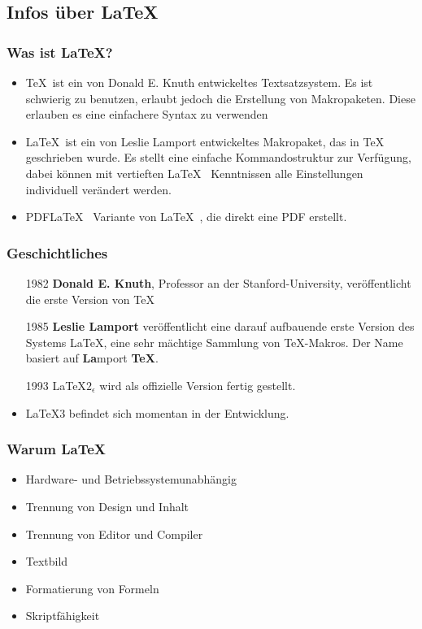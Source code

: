 \subsection{Infos über \LaTeX}


\begin{frame}
\frametitle{Was ist \LaTeX?}
\begin{itemize}[<+->]
  \item \TeX\, ist ein von Donald E. Knuth entwickeltes Textsatzsystem. Es ist schwierig zu benutzen, erlaubt jedoch die Erstellung von Makropaketen. Diese erlauben es eine einfachere Syntax zu verwenden
  \item \LaTeX\, ist ein von Leslie Lamport entwickeltes Makropaket, das in \TeX~ geschrieben wurde. Es stellt eine einfache Kommandostruktur zur Verfügung, dabei können mit vertieften \LaTeX~ Kenntnissen alle Einstellungen individuell verändert werden.
  \item PDF\LaTeX~ Variante von \LaTeX~, die direkt eine PDF erstellt.
\end{itemize}
\end{frame}

\begin{frame}
\frametitle{Geschichtliches}
\begin{itemize}[<+->]
  \item[1982] \textbf{Donald E. Knuth}, Professor an der Stanford-University, veröffentlicht die erste Version von \TeX
  \item[1985] \textbf{Leslie Lamport} veröffentlicht eine darauf aufbauende erste Version des Systems \LaTeX, eine sehr mächtige Sammlung von \TeX-Makros.
    Der Name basiert auf \textbf{La}mport \textbf{\TeX}.
  \item[1993] \LaTeX $2_\epsilon$ wird als offizielle Version fertig gestellt.
  \item \LaTeX 3 befindet sich momentan in der Entwicklung.
\end{itemize}

\end{frame}

\begin{frame}
\frametitle{Warum \LaTeX}
\begin{itemize}[<+->]
  \item Hardware- und Betriebssystemunabhängig
  \item Trennung von Design und Inhalt
  \item Trennung von Editor und Compiler
  \item Textbild
  \item Formatierung von Formeln
  \item Skriptfähigkeit
\end{itemize}
\end{frame}

